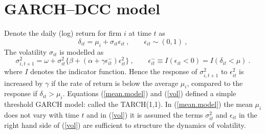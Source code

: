 \documentclass[authoryear]{elsarticle}
\newcommand{\E}{\mathrm{E}}
\newcommand{\e}{\mathrm{e}}
\newcommand{\cov}{\mathrm{cov}}
\newcommand{\eps}{\epsilon}
\newcommand{\Ex}{{\cal E}}
\newcommand{\eref}[1]{(\ref{#1})}
\newcommand{\cq}{\ , \qquad}
\newcommand{\be}[1]{\begin{equation}\label{#1}}
\newcommand{\ee}{\end{equation}}
\begin{document}

\newpage

\appendix
\renewcommand*{\thesection}{\Alph{section}}

\section{GARCH--DCC model}\label{garchdcc}

Denote the daily (log) return for firm $i$ at time $t$ as
\newcommand{\vareps}{\varepsilon}
\be{mean.model}
\delta_{it}=\mu_i+\sigma_{it}\eps_{it}\cq \eps_{it}\sim (0,1)\ ,
\ee
The volatility $\sigma_{it}$ is modelled as
\be{vol}
\sigma_{i,t+1}^2 = \omega+ \sigma^2_{it}\{\beta+(\alpha+\gamma \eps^-_{it})\eps_{it}^2\}  \cq  \eps^-_{it}\equiv I(\eps_{it}<0)=I(\delta_{it}<\mu)\ .
\ee
where $I$ denotes the indicator function.  Hence the response of $\sigma_{i,t+1}^2$ to $\eps_{it}^2$  is increased by $\gamma$   if
the rate of return is below the average $\mu_i$, compared to the response if $\delta_{it}>\mu_i$.  Equations \eref{mean.model} and \eref{vol} defined a simple threshold GARCH model:  called the TARCH(1,1).   In \eref{mean.model} the mean $\mu_i$ does not vary with time $t$ and in \eref{vol} it is assumed the terms  $\sigma_{it}^2$ and $\eps_{it}$ in the right hand side of \eref{vol} are sufficient to structure the dynamics of volatility.
\end{document}
